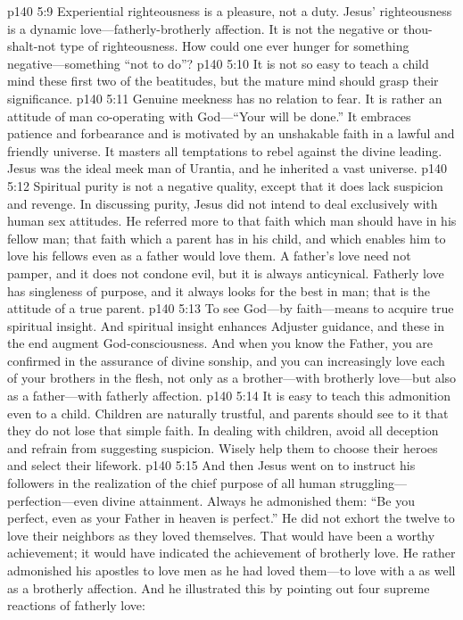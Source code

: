 \vs p140 5:9 Experiential righteousness is a pleasure, not a duty. Jesus’ righteousness is a dynamic love---fatherly\hyp{}brotherly affection. It is not the negative or thou\hyp{}shalt\hyp{}not type of righteousness. How could one ever hunger for something negative---something “not to do”?
\pc \vs p140 5:10 It is not so easy to teach a child mind these first two of the beatitudes, but the mature mind should grasp their significance.
\pc \vs p140 5:11 \bibnobreakspace {} Genuine meekness has no relation to fear. It is rather an attitude of man co\hyp{}operating with God---“Your will be done.” It embraces patience and forbearance and is motivated by an unshakable faith in a lawful and friendly universe. It masters all temptations to rebel against the divine leading. Jesus was the ideal meek man of Urantia, and he inherited a vast universe.
\pc \vs p140 5:12 \bibnobreakspace {} Spiritual purity is not a negative quality, except that it does lack suspicion and revenge. In discussing purity, Jesus did not intend to deal exclusively with human sex attitudes. He referred more to that faith which man should have in his fellow man; that faith which a parent has in his child, and which enables him to love his fellows even as a father would love them. A father’s love need not pamper, and it does not condone evil, but it is always anticynical. Fatherly love has singleness of purpose, and it always looks for the best in man; that is the attitude of a true parent.
\vs p140 5:13 To see God---by faith---means to acquire true spiritual insight. And spiritual insight enhances Adjuster guidance, and these in the end augment God\hyp{}consciousness. And when you know the Father, you are confirmed in the assurance of divine sonship, and you can increasingly love each of your brothers in the flesh, not only as a brother---with brotherly love---but also as a father---with fatherly affection.
\vs p140 5:14 It is easy to teach this admonition even to a child. Children are naturally trustful, and parents should see to it that they do not lose that simple faith. In dealing with children, avoid all deception and refrain from suggesting suspicion. Wisely help them to choose their heroes and select their lifework.
\pc \vs p140 5:15 And then Jesus went on to instruct his followers in the realization of the chief purpose of all human struggling---perfection---even divine attainment. Always he admonished them: \textcolor{ubdarkred}{“Be you perfect, even as your Father in heaven is perfect.”} He did not exhort the twelve to love their neighbors as they loved themselves. That would have been a worthy achievement; it would have indicated the achievement of brotherly love. He rather admonished his apostles to love men as he had loved them---to love with a  as well as a brotherly affection. And he illustrated this by pointing out four supreme reactions of fatherly love:
